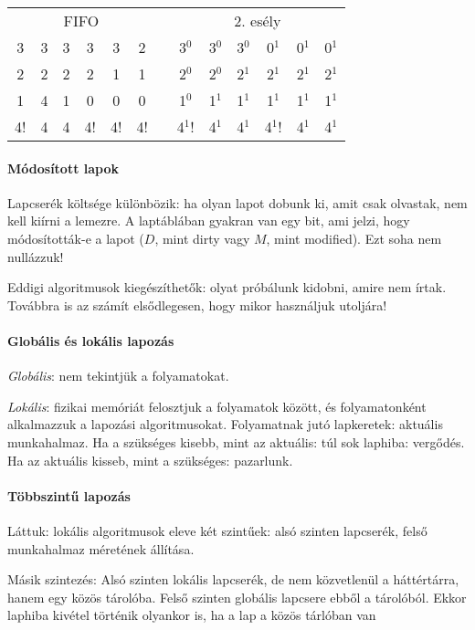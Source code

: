 \documentclass[fleqn,10pt,a4paper]{article}
\theoremstyle{magyar}
\begin{document}
  \begin{tabular}{@{}ccccccccccccc@{}}\toprule
    \multicolumn{6}{c}{FIFO} & & \multicolumn{6}{c}{2. esély}\\\cmidrule{1-6} \cmidrule{8-13}
    3 & 3 & 3 & 3 & 3 & 2 &  & 3$^0$ & 3$^0$ & 3$^0$ & 0$^1$ & 0$^1$ & 0$^1$\\
    2 & 2 & 2 & 2 & 1 & 1 &  & 2$^0$ & 2$^0$ & 2$^1$ & 2$^1$ & 2$^1$ & 2$^1$\\
    1 & 4 & 1 & 0 & 0 & 0 &  & 1$^0$ & 1$^1$ & 1$^1$ & 1$^1$ & 1$^1$ & 1$^1$\\
    4!& 4 & 4 & 4!& 4!& 4!&  & 4$^1$!& 4$^1$ & 4$^1$ & 4$^1$! & 4$^1$ & 4$^1$\\\bottomrule
  \end{tabular}

  \paragraph{Módosított lapok}  Lapcserék költsége különbözik: ha olyan lapot dobunk ki, amit csak olvastak, nem kell
  kiírni a lemezre. A laptáblában gyakran van egy bit, ami jelzi, hogy módosították-e a lapot ($D$, mint dirty vagy $M$,
  mint modified). Ezt soha nem nullázzuk! 
  
  Eddigi algoritmusok kiegészíthetők: olyat próbálunk kidobni, amire nem írtak. Továbbra is az számít elsődlegesen, hogy
  mikor használjuk utoljára!
  

  \paragraph{Globális és lokális lapozás}
  \emph{Globális}: nem tekintjük a folyamatokat.
  
  \emph{Lokális}: fizikai memóriát felosztjuk a folyamatok között, és folyamatonként alkalmazzuk a lapozási algoritmusokat.
  Folyamatnak jutó lapkeretek: aktuális munkahalmaz. Ha a szükséges kisebb, mint az aktuális: túl sok laphiba: vergődés.
  Ha az aktuális kisseb, mint a szükséges: pazarlunk.

  \paragraph{Többszintű lapozás} Láttuk: lokális algoritmusok eleve két szintűek: alsó szinten lapcserék, felső
  munkahalmaz méretének állítása.
  
  Másik szintezés: Alsó szinten lokális lapcserék, de nem közvetlenül a háttértárra, hanem egy közös tárolóba. Felső
  szinten globális lapcsere ebből a tárolóból. Ekkor laphiba kivétel történik olyankor is, ha a lap a közös tárlóban van
\end{document}
